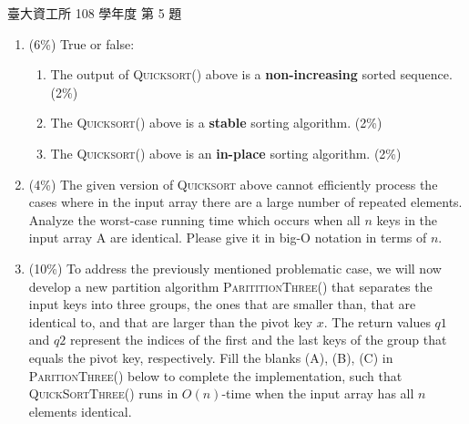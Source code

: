 \begin{pastexam}[label={px:ntu-108-dsaa-05}]{臺大資工所 108 學年度 第 5 題}
\begin{enumerate}[label=(\alph*)]
\item (6\%) True or false:
\begin{enumerate}[label=(\arabic*)]
\item The output of \textsc{Quicksort}() above is a \textbf{non-increasing} sorted sequence. (2\%)
\item The \textsc{Quicksort}() above is a \textbf{stable} sorting algorithm. (2\%)
\item The \textsc{Quicksort}() above is an \textbf{in-place} sorting algorithm. (2\%)
\end{enumerate}
\item (4\%) The given version of \textsc{Quicksort} above cannot efficiently process the cases
where in the input array there are a large number of repeated elements. Analyze the worst-case
running time which occurs when all $n$ keys in the input array A are identical. Please give it in
big-O notation in terms of $n$.
\item (10\%) To address the previously mentioned problematic case, we will now develop a new
partition algorithm \textsc{ParititionThree}() that separates the input keys into three groups,
the ones that are smaller than, that are identical to, and that are larger than the pivot key $x$.
The return values $q1$ and $q2$ represent the indices of the first and the last keys of the group
that equals the pivot key, respectively. Fill the blanks (A), (B), (C) in \textsc{ParitionThree}()
below to complete the implementation, such that \textsc{QuickSortThree}() runs in $O(n)$-time
when the input array has all $n$ elements identical.
\end{enumerate}


\end{pastexam}
